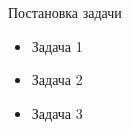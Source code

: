 
\begin{frame}{Постановка задачи}
    \begin{itemize}
        \item Задача 1
        \item Задача 2
        \item Задача 3
    \end{itemize}
\end{frame}
